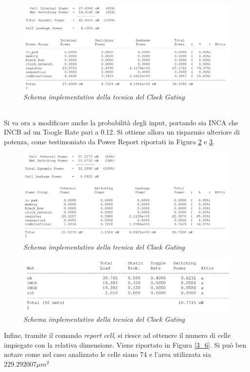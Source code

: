 \begin{figure}[!htb]
	\centering
	\includegraphics[scale=0.8]{immagini/3_3}
	\caption{\textit{Schema implementativo della tecnica del Clock Gating}}
	\label{3_3}
\end{figure}
\\
Si va ora a modificare anche la probabilità degli input, portando sia INCA che INCB ad un Toogle Rate pari a 0.12. Si ottiene allora un risparmio ulteriore di potenza, come testimoniato da Power Report riportati in Figura \ref{3_4} e \ref{3_5}. \\
\begin{figure}[!htb]
	\centering
	\includegraphics[scale=0.8]{immagini/3_4}
	\caption{\textit{Schema implementativo della tecnica del Clock Gating}}
	\label{3_4}
\end{figure}
\begin{figure}[!htb]
	\centering
	\includegraphics[scale=0.8]{immagini/3_5}
	\caption{\textit{Schema implementativo della tecnica del Clock Gating}}
	\label{3_5}
\end{figure}
\newpage
\noindent Infine, tramite il comando \textit{report cell}, si riesce ad ottenere il numero di celle impiegate con la relativa dimensione. Viene riportato in Figura \ref{3_6}. Si può ben notare come nel caso analizzato le celle siano 74 e l'area utilizzata sia $229.292007 \mu m^{2}$ \\

